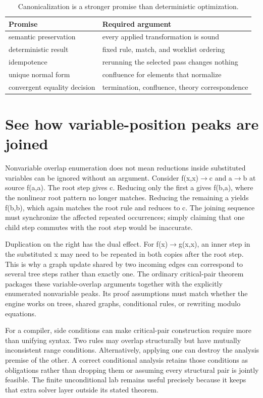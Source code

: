 \begin{table}[htbp]
\caption{Canonicalization is a stronger promise than deterministic optimization.}
\label{tab:ch84-contracts}
\centering
\begin{tabular}{ll}
\toprule
Promise & Required argument \\
\midrule
semantic preservation & every applied transformation is sound \\
deterministic result & fixed rule, match, and worklist ordering \\
idempotence & rerunning the selected pass changes nothing \\
unique normal form & confluence for elements that normalize \\
convergent equality decision & termination, confluence, theory correspondence \\
\bottomrule
\end{tabular}
\end{table}

\section{See how variable-position peaks are joined}
\label{sec:ch84-variable-peaks}
Nonvariable overlap enumeration does not mean reductions inside substituted variables can be ignored without an argument.
Consider f(x,x)$\to$c and a$\to$b at source f(a,a).
The root step gives c.
Reducing only the first a gives f(b,a), where the nonlinear root pattern no longer matches.
Reducing the remaining a yields f(b,b), which again matches the root rule and reduces to c.
The joining sequence must synchronize the affected repeated occurrences; simply claiming that one child step commutes with the root step would be inaccurate.

Duplication on the right has the dual effect.
For f(x)$\to$g(x,x), an inner step in the substituted x may need to be repeated in both copies after the root step.
This is why a graph update shared by two incoming edges can correspond to several tree steps rather than exactly one.
The ordinary critical-pair theorem packages these variable-overlap arguments together with the explicitly enumerated nonvariable peaks.
Its proof assumptions must match whether the engine works on trees, shared graphs, conditional rules, or rewriting modulo equations.

For a compiler, side conditions can make critical-pair construction require more than unifying syntax.
Two rules may overlap structurally but have mutually inconsistent range conditions.
Alternatively, applying one can destroy the analysis premise of the other.
A correct conditional analysis retains those conditions as obligations rather than dropping them or assuming every structural pair is jointly feasible.
The finite unconditional lab remains useful precisely because it keeps that extra solver layer outside its stated theorem.

